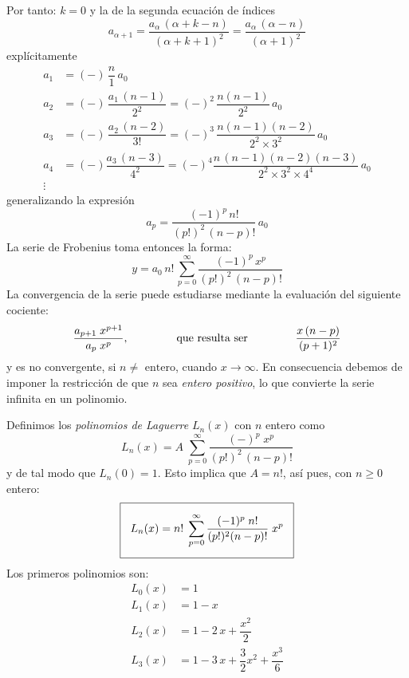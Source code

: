 Por tanto: $k = 0$ y la de la segunda ecuación de índices
\[ a_{\alpha + 1} = \dfrac{a_{\alpha} \, (\alpha + k - n)}{(\alpha + k + 1)^{2}} = \dfrac{a_{\alpha} \, (\alpha - n)}{(\alpha + 1)^{2}} \]
explícitamente
\begin{align*}
a_{1} &= (-) \, \dfrac{n}{1} \, a_{0} \\
a_{2} &= (-) \, \dfrac{a_{1} \, (n - 1)}{2^{2}} = (-)^{2} \, \dfrac{n (n - 1)}{2^{2}} \, a_{0} \\
a_{3} &= (-) \, \dfrac{a_{2} \, (n - 2)}{3!} = (-)^{3} \, \dfrac{n (n - 1)(n - 2)}{2^{2} \times 3^{2}} \, a_{0} \\
a_{4} &= (-) \dfrac{a_{3} \, (n - 3)}{4^{2}} = (-)^{4} \dfrac{n \, (n - 1)(n - 2)(n - 3)}{2^{2} \times 3^{2} \times 4^{4}} \, a_{0} \\
\vdots
\end{align*}
generalizando la expresión
\[ a_{p} = \dfrac{(-1)^{p} \, n!}{(p!)^{2} \, (n - p)!} \, a_{0} \]
La serie de Frobenius toma entonces la forma:
\[ y = a_{0} \, n! \, \sum_{p=0}^{\infty} \dfrac{(-1)^{p} \, x^{p}}{(p!)^{2} \, (n - p)! } \]
La convergencia de la serie puede estudiarse mediante la evaluación del siguiente cociente:
\[ \dfrac{a_{p + 1} \; x^{p + 1}}{a_{p} \; x^{p}}, \hspace{1.5cm} \mbox{que resulta ser} \hspace{1.5cm} \dfrac{x \, (n - p)}{(p + 1)^{2}} \]
y es no convergente, si $n \neq \mbox{ entero}$, cuando $x \to \infty$. En consecuencia debemos de imponer la restricción de que $n$ sea \emph{entero positivo}, lo que convierte la serie infinita en un polinomio.
\par
Definimos los \emph{polinomios de Laguerre} $L_{n}(x)$ con $n$ entero como
\[ L_{n}(x) = A \; \sum_{p = 0}^{\infty} \dfrac{(-)^{p} \; x^{p}}{(p!)^{2} \, (n - p)!} \]
y de tal modo que $L_{n}(0) = 1$. Esto implica que $A = n!$, así pues, con $n \geq 0$ entero:
\begin{equation}
\setlength{\fboxsep}{3\fboxsep}\boxed{ L_{n}(x) = n! \; \sum_{p = 0}^{\infty} \dfrac{(-1)^{p} \; n!}{(p!)^{2} (n - p)!} \; x^{p}}
\label{eq:ecuacion_08_76}
\end{equation}
Los primeros polinomios son:
\begin{align*}
L_{0} (x) &= 1 \\
L_{1} (x) &= 1 - x \\
L_{2} (x) &= 1 - 2 \, x + \dfrac{x^{2}}{2} \\
L_{3} (x) &= 1 - 3 \, x + \dfrac{3}{2} x^{2} + \dfrac{x^{3}}{6} \\
\end{align*}
